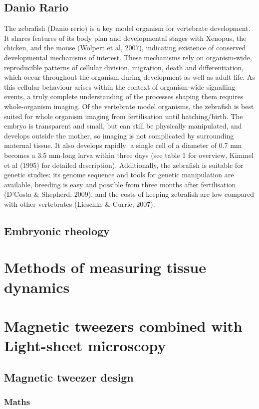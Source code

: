 \subsection{Danio Rario}
The zebrafish (Danio rerio) is a key model organism for vertebrate development.
It shares features of its body plan and developmental stages with Xenopus, the chicken, and the mouse (Wolpert et al, 2007), indicating existence of
conserved developmental mechanisms of interest.
These mechanisms rely on organism-wide, reproducible patterns of cellular division, migration, death and differentiation, which occur throughout the organism during development as well as adult life.
As this cellular behaviour arises within the context of organism-wide signalling events, a truly complete understanding of the processes shaping them
requires whole-organism imaging.
Of the vertebrate model organisms, the zebrafish is best suited for whole organism imaging from fertilisation until hatching/birth. The embryo is transparent and small, but can still be physically manipulated, and develops outside the mother, so imaging is not complicated by surrounding maternal tissue. It also develops rapidly: a single cell of a diameter of 0.7 mm becomes a 3.5 mm-long larva within three days (see table 1 for overview, Kimmel et al (1995) for detailed description).
Additionally, the zebrafish is suitable for genetic studies: its genome sequence and tools for genetic manipulation are available, breeding is easy and possible from three months after fertilisation (D'Costa & Shepherd, 2009), and the costs of keeping zebrafish are low compared with other vertebrates (Lieschke & Currie, 2007).
\subsection{Embryonic rheology}
\section{Methods of measuring tissue dynamics}
\section{Magnetic tweezers combined with Light-sheet microscopy}
\subsection{Magnetic tweezer design}
\subsubsection{Maths}

